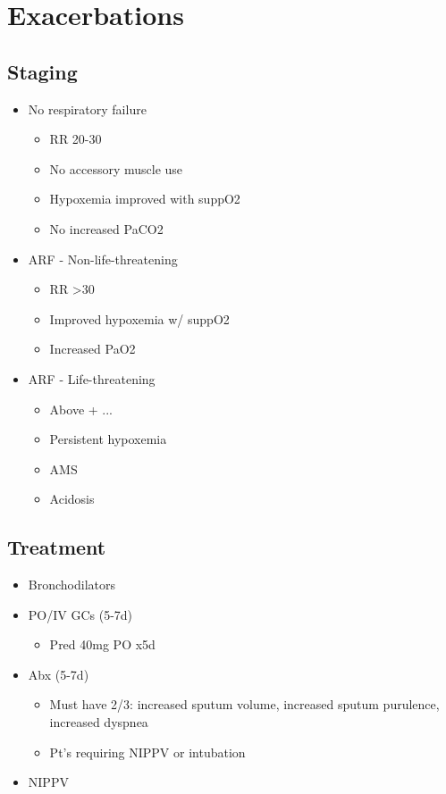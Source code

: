 \documentclass[main.tex]{subfiles}
\begin{document}
\section{Exacerbations}
\subsection{Staging}
\begin{itemize}[noitemsep]
	\item No respiratory failure
	\begin{itemize}[noitemsep]
		\item RR 20-30
		\item No accessory muscle use
		\item Hypoxemia improved with suppO2
		\item No increased PaCO2
	\end{itemize}
	\item ARF - Non-life-threatening
	\begin{itemize}[noitemsep]
		\item RR \textgreater 30
		\item Improved hypoxemia w/ suppO2
		\item Increased PaO2
	\end{itemize}
	\item ARF - Life-threatening
	\begin{itemize}[noitemsep]
		\item Above + ...
		\item Persistent hypoxemia
		\item AMS
		\item Acidosis
	\end{itemize}
\end{itemize}

\subsection{Treatment}
\begin{itemize}[noitemsep]
	\item Bronchodilators
	\item PO/IV GCs (5-7d)
	\begin{itemize}[noitemsep]
		\item Pred 40mg PO x5d 
	\end{itemize}
	\item Abx (5-7d)
	\begin{itemize}[noitemsep]
		\item Must have 2/3: increased sputum volume, increased sputum purulence, increased dyspnea
		\item Pt's requiring NIPPV or intubation
	\end{itemize}
	\item NIPPV
\end{itemize}

\nocite{goldsciencecommitteeGlobalInitiativeChronic2019}

\printmybib
\end{document}
